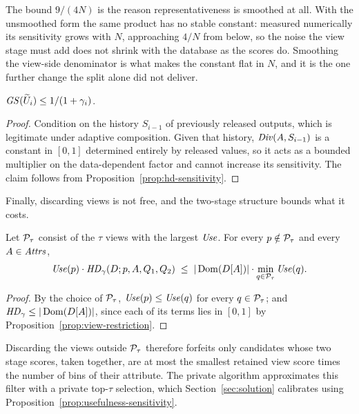 
The bound $9/(4N)$ is the reason representativeness is smoothed at all.
With the unsmoothed form the same product has no stable constant: measured numerically its sensitivity grows with $N$, approaching $4/N$ from below, so the noise the view stage must add does not shrink with the database as the scores do.
Smoothing the view-side denominator is what makes the constant flat in $N$, and it is the one further change the split alone did not deliver.

\begin{proposition}
\label{prop:selection-utility-sensitivity}
$\mathit{GS}(\widetilde{U}_i)\le 1/(1+\gamma_i)$.
\end{proposition}

\begin{proof}
Condition on the history $S_{i-1}$ of previously released outputs, which is legitimate under adaptive composition.
Given that history, $\mathit{Div}(A,S_{i-1})$ is a constant in $[0,1]$ determined entirely by released values, so it acts as a bounded multiplier on the data-dependent factor and cannot increase its sensitivity.
The claim follows from Proposition~\ref{prop:hd-sensitivity}.
\end{proof}

Finally, discarding views is not free, and the two-stage structure bounds what it costs.

\begin{lemma}[Filtering]
\label{lem:filtering}
Let $\mathcal{P}_\tau$ consist of the $\tau$ views with the largest $\mathit{Use}$.
For every $p\notin\mathcal{P}_\tau$ and every $A\in\mathit{Attrs}$,
\[
\mathit{Use}(p)\cdot\mathit{HD}_\gamma(D;p,A,Q_1,Q_2)\;\le\;|\operatorname{Dom}(D[A])|\cdot\min_{q\in\mathcal{P}_\tau}\mathit{Use}(q).
\]
\end{lemma}

\begin{proof}
By the choice of $\mathcal{P}_\tau$, $\mathit{Use}(p)\le\mathit{Use}(q)$ for every $q\in\mathcal{P}_\tau$; and $\mathit{HD}_\gamma\le|\operatorname{Dom}(D[A])|$, since each of its terms lies in $[0,1]$ by Proposition~\ref{prop:view-restriction}.
\end{proof}

Discarding the views outside $\mathcal{P}_\tau$ therefore forfeits only candidates whose two stage scores, taken together, are at most the smallest retained view score times the number of bins of their attribute.
The private algorithm approximates this filter with a private top-$\tau$ selection, which Section~\ref{sec:solution} calibrates using Proposition~\ref{prop:usefulness-sensitivity}.
